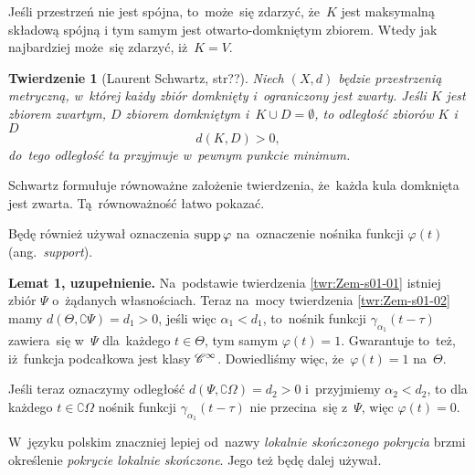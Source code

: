 \documentclass[a4paper,11pt]{article}
\newtheorem{twr}{Twierdzenie} %
\begin{document}
Jeśli przestrzeń nie jest spójna, to~może~się zdarzyć, że~$K$ jest
maksymalną składową spójną i tym samym jest otwarto-domkniętym
zbiorem. Wtedy jak najbardziej może~się zdarzyć, iż~$K = V$.

\begin{twr}[Laurent Schwartz,
  str??\cite{SchwartzKursAnalizyMatematycznejVolI1979}]
  \label{thm:Zem-s01-02}
  Niech $( X, d )$ będzie przestrzenią metryczną, w~której każdy zbiór
  domknięty i~ograniczony jest zwarty. Jeśli $K$ jest zbiorem zwartym,
  $D$ zbiorem domkniętym i~$K \cup D = \emptyset$, to odległość zbiorów $K$
  i~$D$
  \begin{equation}
    \label{eq:Zem-s01-05}
    d( K, D ) > 0,
  \end{equation}
  do~tego odległość ta przyjmuje w~pewnym punkcie minimum.
\end{twr}
\noindent Schwartz formułuje równoważne założenie twierdzenia, że~każda
kula domknięta jest zwarta. Tą~równoważność łatwo pokazać.

Będę również używał oznaczenia $\mathrm{supp}\, \varphi$ na~oznaczenie nośnika
funkcji $\varphi( t )$ (ang.~\textit{support}).

\vspace{\spaceFour}



\start {} \textbf{Lemat 1, uzupełnienie.} Na~podstawie
twierdzenia \eqref{twr:Zem-s01-01} istniej zbiór $\Psi$ o~żądanych
własnościach. Teraz na~mocy twierdzenia \eqref{twr:Zem-s01-02} mamy
$d( \Theta, \complement \Psi ) = d_{ 1 } > 0$, jeśli więc
$\alpha_{ 1 } < d_{ 1 }$, to~nośnik funkcji
$\gamma_{ \alpha_{ 1 } }( t - \tau )$ zawiera~się w~$\Psi$ dla~każdego
$t \in \Theta$, tym samym $\varphi( t ) = 1$. Gwarantuje to~też,
iż~funkcja podcałkowa jest klasy $\mathcal{C}^{ \infty }$. Dowiedliśmy więc,
że~$\varphi( t ) = 1$ na~$\Theta$.

Jeśli teraz oznaczymy odległość $d( \Psi, \complement \Omega ) = d_{ 2 } > 0$
i~przyjmiemy $\alpha_{ 2 } < d_{ 2 }$, to dla każdego $t \in \complement \Omega$
nośnik funkcji $\gamma_{ \alpha_{ 1 } }( t - \tau )$ nie przecina~się
z~$\Psi$, więc $\varphi( t ) = 0$.

\vspace{\spaceFour}



\start {} W~języku polskim znaczniej lepiej od~nazwy
\textit{lokalnie skończonego pokrycia} brzmi określenie \textit{pokrycie
  lokalnie skończone}. Jego też będę dalej używał.
\end{document}
